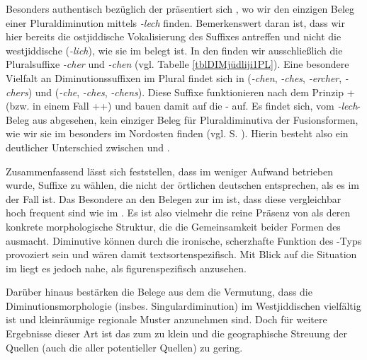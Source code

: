     Besonders authentisch bezüglich der  präsentiert sich , wo wir den einzigen Beleg einer Pluraldiminution mittels \textit{-lech} finden. Bemerkenswert daran ist, dass wir hier bereits die ostjiddische Vokalisierung des Suffixes antreffen und nicht die westjiddische (\textit{-lich}), wie sie im  belegt ist. In den  finden wir ausschließlich die Pluralsuffixe \textit{-cher} und \textit{-chen} (vgl. Tabelle \ref{tblDIMjüdliji1PL}). Eine besondere Vielfalt an Diminutionssuffixen im Plural findet sich in  (\textit{-chen}, \textit{-ches}, \textit{-ercher}, \textit{-chers}) und  (\textit{-che}, \textit{-ches}, \textit{-chens}). Diese Suffixe funktionieren nach dem Prinzip + (bzw. in einem Fall ++) und bauen damit auf die - auf. Es findet sich, vom \textit{-lech}-Beleg aus  abgesehen, kein einziger Beleg für Pluraldiminutiva der Fusionsformen, wie wir sie im  besonders im Nordosten finden (vgl. S. \pageref{LKinberlin}). Hierin besteht also ein deutlicher Unterschied zwischen  und . 

Zusammenfassend lässt sich feststellen, dass im  weniger Aufwand betrieben wurde, Suffixe zu wählen, die nicht der örtlichen deutschen  entsprechen, als es im  der Fall ist. Das Besondere an den Belegen zur  im  ist, dass diese vergleichbar hoch frequent sind wie im . Es ist also vielmehr die reine Präsenz von  als deren konkrete morphologische Struktur, die die Gemeinsamkeit beider Formen des  ausmacht. Diminutive können durch die ironische, scherzhafte Funktion des -Typs provoziert sein und wären damit textsortenspezifisch. Mit Blick auf die Situation im  liegt es jedoch nahe,  als figurenspezifisch  anzusehen. 

Darüber hinaus bestärken die Belege aus dem  die Vermutung, dass die Diminutionsmorphologie (insbes. Singulardiminution) im Westjiddischen vielfältig ist und kleinräumige regionale Muster anzunehmen sind. Doch für weitere Ergebnisse dieser Art ist das  zum  zu klein und die geographische Streuung der Quellen (auch die aller potentieller Quellen) zu gering. \\

